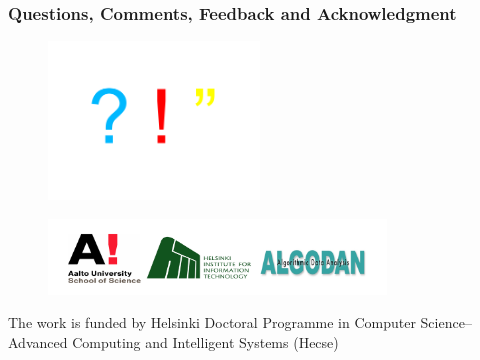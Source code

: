\documentclass[first=dgreen,second=purple,logo=redexc]{aaltoslides}
\begin{document}



\begin{frame}
 \frametitle{Questions, Comments, Feedback and Acknowledgment}
 \begin{figure}[h!]
 \centering
 \includegraphics[width=0.5\textwidth]{figures/questions}
 \end{figure}
 
 \vspace{-15mm}
 
 \begin{figure}[h!]
 \centering
 \includegraphics[width=0.8\textwidth]{figures/logoslong}
 \end{figure}
 
 \vspace{-5mm}
 
 \small The work is funded by Helsinki Doctoral Programme in Computer Science--Advanced Computing and Intelligent Systems (Hecse)
 \end{frame}
 
\end{document}

